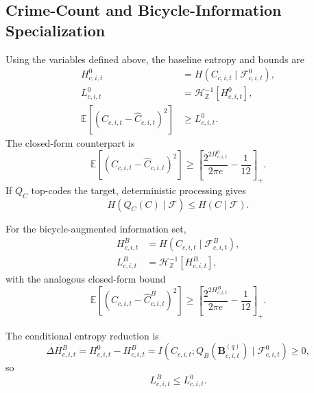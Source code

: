 \subsection{Crime-Count and Bicycle-Information Specialization}
\label{subsec:theory_application_appendix}

Using the variables defined above, the baseline entropy and bounds are
\begin{align}
H^0_{c,i,t}
&=H(C_{c,i,t}\mid\mathcal F^0_{c,i,t}),
\label{eq:crime_baseline_entropy}\\
L^0_{c,i,t}
&=\mathcal H_{\mathbb Z}^{-1}[H^0_{c,i,t}],
\label{eq:local_bound_baseline}\\
\mathbb E[(C_{c,i,t}-\widehat C_{c,i,t})^2]
&\geq L^0_{c,i,t}.
\label{eq:crime_baseline_exact_bound}
\end{align}
The closed-form counterpart is
\begin{equation}
\mathbb E[(C_{c,i,t}-\widehat C_{c,i,t})^2]
\geq
\left[\frac{2^{2H^0_{c,i,t}}}{2\pi e}-\frac1{12}\right]_+ .
\label{eq:crime_baseline_closed_bound}
\end{equation}
If \(Q_C\) top-codes the target, deterministic processing gives
\begin{equation}
H(Q_C(C)\mid\mathcal F)\leq H(C\mid\mathcal F).
\label{eq:top_coded_entropy_order}
\end{equation}

For the bicycle-augmented information set,
\begin{align}
H^B_{c,i,t}
&=H(C_{c,i,t}\mid\mathcal F^B_{c,i,t}),
\label{eq:crime_bicycle_entropy}\\
L^B_{c,i,t}
&=\mathcal H_{\mathbb Z}^{-1}[H^B_{c,i,t}],
\label{eq:local_bound_bike}
\end{align}
with the analogous closed-form bound
\begin{equation}
\mathbb E[(C_{c,i,t}-\widehat C^B_{c,i,t})^2]
\geq
\left[\frac{2^{2H^B_{c,i,t}}}{2\pi e}-\frac1{12}\right]_+ .
\label{eq:crime_bicycle_closed_bound}
\end{equation}

\begin{Proposition}
\label{prop:bicycle_information_value}
The conditional entropy reduction is
\begin{equation}
\Delta H^B_{c,i,t}
=H^0_{c,i,t}-H^B_{c,i,t}
=I(C_{c,i,t};Q_B(\mathbf B^{(q)}_{c,i,t})
\mid\mathcal F^0_{c,i,t})\geq0,
\label{eq:bicycle_information_gain}
\end{equation}
so
\begin{equation}
L^B_{c,i,t}\leq L^0_{c,i,t}.
\label{eq:bicycle_exact_bound_order}
\end{equation}
\end{Proposition}

